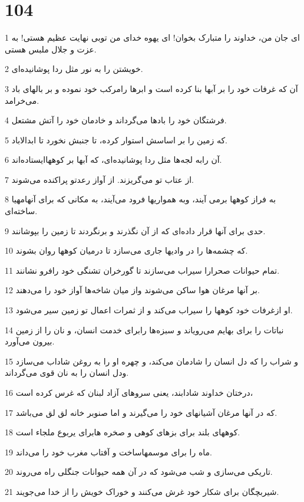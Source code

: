 \chapter{104}

\par 1 ای جان من، خداوند را متبارک بخوان! ای یهوه خدای من توبی نهایت عظیم هستی! به عزت و جلال ملبس هستی.
\par 2 خویشتن را به نور مثل ردا پوشانیده‌ای.
\par 3 آن که غرفات خود را بر آبها بنا کرده است و ابرها رامرکب خود نموده و بر بالهای باد می‌خرامد.
\par 4 فرشتگان خود را بادها می‌گرداند و خادمان خود را آتش مشتعل.
\par 5 که زمین را بر اساسش استوار کرده، تا جنبش نخورد تا ابدالاباد.
\par 6 آن رابه لجه‌ها مثل ردا پوشانیده‌ای، که آبها بر کوههاایستاده‌اند.
\par 7 از عتاب تو می‌گریزند. از آواز رعدتو پراکنده می‌شوند.
\par 8 به فراز کوهها برمی آیند، وبه همواریها فرود می‌آیند، به مکانی که برای آنهامهیا ساخته‌ای.
\par 9 حدی برای آنها قرار داده‌ای که از آن نگذرند و برنگردند تا زمین را بپوشانند.
\par 10 که چشمه‌ها را در وادیها جاری می‌سازد تا درمیان کوهها روان بشوند.
\par 11 تمام حیوانات صحرارا سیراب می‌سازند تا گورخران تشنگی خود رافرو نشانند.
\par 12 بر آنها مرغان هوا ساکن می‌شوند واز میان شاخه‌ها آواز خود را می‌دهند.
\par 13 او ازغرفات خود کوهها را سیراب می‌کند و از ثمرات اعمال تو زمین سیر می‌شود. 
\par 14 نباتات را برای بهایم می‌رویاند و سبزه‌ها رابرای خدمت انسان، و نان را از زمین بیرون می‌آورد.
\par 15 و شراب را که دل انسان را شادمان می‌کند، و چهره او را به روغن شاداب می‌سازد ودل انسان را به نان قوی می‌گرداند.
\par 16 درختان خداوند شادابند، یعنی سروهای آزاد لبنان که غرس کرده است،
\par 17 که در آنها مرغان آشیانهای خود را می‌گیرند و اما صنوبر خانه لق لق می‌باشد.
\par 18 کوههای بلند برای بزهای کوهی و صخره هابرای یربوع ملجاء است.
\par 19 ماه را برای موسمهاساخت و آفتاب مغرب خود را می‌داند.
\par 20 تاریکی می‌سازی و شب می‌شود که در آن همه حیوانات جنگلی راه می‌روند.
\par 21 شیربچگان برای شکار خود غرش می‌کنند و خوراک خویش را از خدا می‌جویند.
